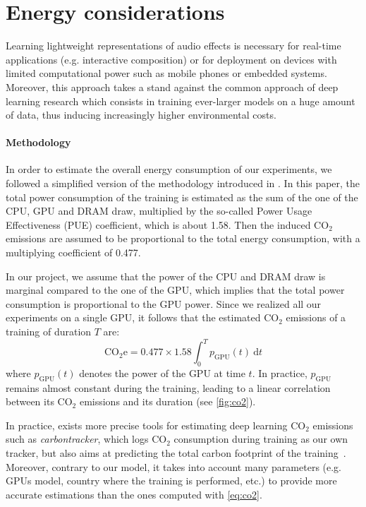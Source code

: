 \documentclass{article}
\begin{document}
\section{Energy considerations}\label{sec:energy}

Learning lightweight representations of audio effects is necessary for real-time applications (e.g. interactive composition) or for deployment on devices with limited computational power such as mobile phones or embedded systems.
Moreover, this approach takes a stand against the common approach of deep learning research which consists in training ever-larger models on a huge amount of data, thus inducing increasingly higher environmental costs.

\paragraph*{Methodology}

In order to estimate the overall energy consumption of our experiments, we followed a simplified version of the methodology introduced in \cite{Energy}. In this paper, the total power consumption of the training is estimated as the sum of the one of the CPU, GPU and DRAM draw, multiplied by the so-called Power Usage Effectiveness (PUE) coefficient, which is about 1.58. Then the induced CO$_2$ emissions are assumed to be proportional to the total energy consumption, with a multiplying coefficient of 0.477.

In our project, we assume that the power of the CPU and DRAM draw is marginal compared to the one of the GPU, which implies that the total power consumption is proportional to the GPU power. Since we realized all our experiments on a single GPU, it follows that the estimated CO$_2$ emissions of a training of duration $T$ are:
\begin{equation}
    \text{CO}_2\text{e} = 0.477 \times 1.58 \int_0^T p_{\text{GPU}}(t) \ \text{d}t
    \label{eq:co2}
\end{equation}
where $p_{\text{GPU}}(t)$ denotes the power of the GPU at time $t$. In practice, $p_{\text{GPU}}$ remains almost constant during the training, leading to a linear correlation between its CO$_2$ emissions and its duration (see \autoref{fig:co2}).

In practice, exists more precise tools for estimating deep learning CO$_2$ emissions such as \emph{carbontracker}, which logs CO$_2$ consumption during training as our own tracker, but also aims at predicting the total carbon footprint of the training~\cite{Carbontracker}. Moreover, contrary to our model, it takes into account many parameters (e.g. GPUs model, country where the training is performed, etc.) to provide more accurate estimations than the ones computed with \autoref{eq:co2}.
\end{document}
